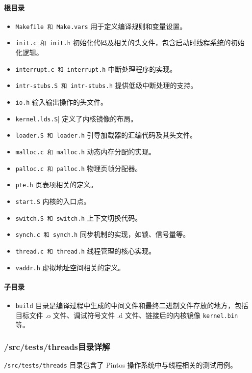 \documentclass{article}
\begin{document}
\paragraph{根目录}
\begin{itemize}
	\item \texttt{Makefile 和 Make.vars} 用于定义编译规则和变量设置。
	\item \texttt{init.c 和 init.h} 初始化代码及相关的头文件，包含启动时线程系统的初始化逻辑。
	\item \texttt{interrupt.c 和 interrupt.h} 中断处理程序的实现。
	\item \texttt{intr-stubs.S 和 intr-stubs.h} 提供低级中断处理的支持。
	\item \texttt{io.h} 输入输出操作的头文件。
	\item \texttt{kernel.lds.S}] 定义了内核镜像的布局。
	\item \texttt{loader.S 和 loader.h} 引导加载器的汇编代码及其头文件。
	\item \texttt{malloc.c 和 malloc.h} 动态内存分配的实现。
	\item \texttt{palloc.c 和 palloc.h} 物理页帧分配器。
	\item \texttt{pte.h} 页表项相关的定义。
	\item \texttt{start.S} 内核的入口点。
	\item \texttt{switch.S 和 switch.h} 上下文切换代码。
	\item \texttt{synch.c 和 synch.h} 同步机制的实现，如锁、信号量等。
	\item \texttt{thread.c 和 thread.h} 线程管理的核心实现。
	\item \texttt{vaddr.h} 虚拟地址空间相关的定义。
\end{itemize}

\paragraph{子目录}

\begin{itemize}
	\item \texttt{build} 目录是编译过程中生成的中间文件和最终二进制文件存放的地方，包括目标文件 .o 文件、调试符号文件 .d 文件、链接后的内核镜像 \texttt{kernel.bin} 等。
\end{itemize}

\subsubsection{/src/tests/threads目录详解}
\texttt{/src/tests/threads} 目录包含了 Pintos 操作系统中与线程相关的测试用例。
\end{document}
